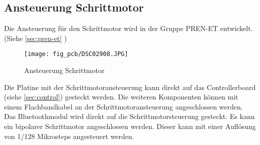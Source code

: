 \subsection{Ansteuerung Schrittmotor}
\label{sec:stepperdriver}
Die Ansteuerung für den Schrittmotor wird in der Gruppe PREN-ET entwickelt. 
(Siehe \ref{sec:pren-et} ) 
\begin{figure}[h!]
    \centering
    \texttt{[image: fig\_pcb/DSC02908.JPG]}
    \caption{Ansteuerung Schrittmotor}
    \label{fig:dc}
\end{figure}

\noindent
Die Platine mit der Schrittmotoransteuerung kann direkt auf das 
Controllerboard (siehe \ref{sec:control}) gesteckt werden. Die weiteren 
Komponenten können mit einem Flachbandkabel an der Schrittmotoransteuerung 
angeschlossen werden. Das Bluetoothmodul wird direkt auf die 
Schrittmotorsteuerung gesteckt. Es kann ein bipolarer Schrittmotor 
angeschlossen werden. Dieser kann mit einer Auflösung von 1/128 Mikrosteps 
angesteuert werden. 
